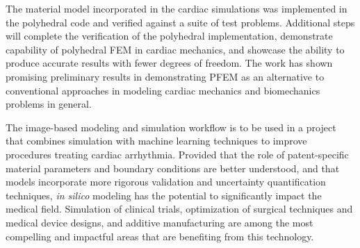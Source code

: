 The material model incorporated in the cardiac simulations was implemented in the polyhedral code and verified against a suite of test problems. Additional steps will complete the verification of the polyhedral implementation, demonstrate capability of polyhedral FEM in cardiac mechanics, and showcase the ability to produce accurate results with fewer degrees of freedom. The work has shown promising preliminary results in demonstrating PFEM as an alternative to conventional approaches in modeling cardiac mechanics and biomechanics problems in general.

The image-based modeling and simulation workflow is to be used in a project that combines simulation with machine learning techniques to improve procedures treating cardiac arrhythmia. Provided that the role of patent-specific material parameters and boundary conditions are better understood, and that models incorporate more rigorous validation and uncertainty quantification techniques, \textit{in silico} modeling has the potential to significantly impact the medical field. Simulation of clinical trials, optimization of surgical techniques and medical device designs, and additive manufacturing are among the most compelling and impactful areas that are benefiting from this technology.